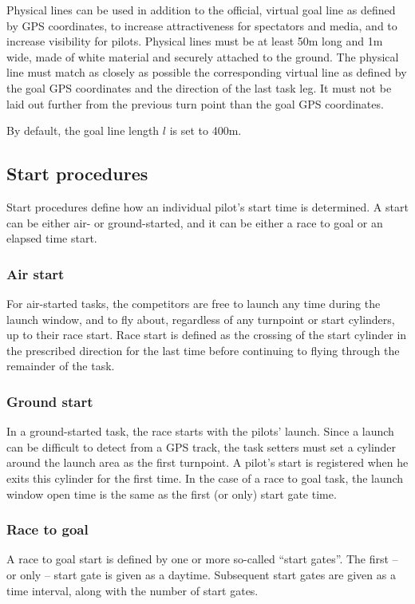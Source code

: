 \documentclass{article}
\begin{document}
Physical lines can be used in addition to the official, virtual goal line as
defined by GPS coordinates, to increase attractiveness for spectators and
media, and to increase visibility for pilots. Physical lines must be at least
50m long and 1m wide, made of white material and securely attached to the
ground. The physical line must match as closely as possible the corresponding
virtual line as defined by the goal GPS coordinates and the direction of the
last task leg. It must not be laid out further from the previous turn point
than the goal GPS coordinates.

By default, the goal line length \(l\) is set to 400m.

\subsection{Start procedures}
Start procedures define how an individual pilot’s start time is determined.
A start can be either air- or ground-started, and it can be either a race to
goal or an elapsed time start.

\subsubsection{Air start}
For air-started tasks, the competitors are free to launch any time during the
launch window, and to fly about, regardless of any turnpoint or start
cylinders, up to their race start. Race start is defined as the crossing of the
start cylinder in the prescribed direction for the last time before continuing
to flying through the remainder of the task.

\subsubsection{Ground start}
In a ground-started task, the race starts with the pilots’ launch. Since
a launch can be difficult to detect from a GPS track, the task setters must set
a cylinder around the launch area as the first turnpoint. A pilot’s start is
registered when he exits this cylinder for the first time. In the case of
a race to goal task, the launch window open time is the same as the first (or
only) start gate time.

\subsubsection{Race to goal}
A race to goal start is defined by one or more so-called “start gates”. The
first – or only – start gate is given as a daytime. Subsequent start gates are
given as a time interval, along with the number of start gates.
\end{document}
